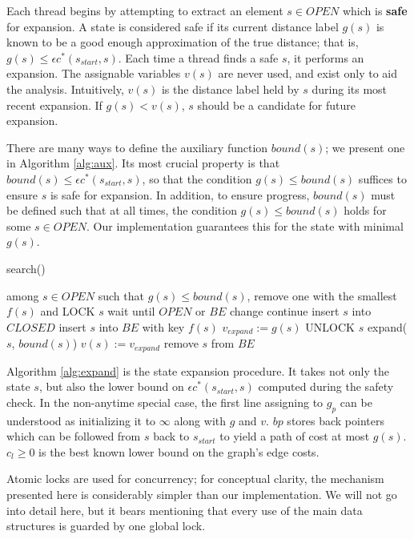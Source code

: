 \documentclass[letterpaper]{article}
\begin{document}
Each thread begins by attempting to extract an element $s\in OPEN$ which is \textbf{safe} for expansion. A state is considered safe if its current distance label $g(s)$ is known to be a good enough approximation of the true distance; that is, $g(s) \le \epsilon c^*(s_{start},s)$. Each time a thread finds a safe $s$, it performs an expansion. The assignable variables $v(s)$ are never used, and exist only to aid the analysis. Intuitively, $v(s)$ is the distance label held by $s$ during its most recent expansion. If $g(s) < v(s)$, $s$ should be a candidate for future expansion.

There are many ways to define the auxiliary function $bound(s)$; we present one in Algorithm \ref{alg:aux}. Its most crucial property is that $bound(s) \le \epsilon c^*(s_{start},s)$, so that the condition $g(s) \le bound(s)$ suffices to ensure $s$ is safe for expansion. In addition, to ensure progress, $bound(s)$ must be defined such that at all times, the condition $g(s) \le bound(s)$ holds for some $s\in OPEN$. Our implementation guarantees this for the state with minimal $g(s)$.

\begin{algorithm}
\caption{search()}
\label{alg:search}
\begin{algorithmic}
\STATE among $s\in OPEN$ such that $g(s) \le bound(s)$, remove one with the smallest $f(s)$ and LOCK $s$
\STATE wait until $OPEN$ or $BE$ change
\STATE continue
\ENDIF
\STATE insert $s$ into $CLOSED$
\STATE insert $s$ into $BE$ with key $f(s)$
\STATE $v_{expand} := g(s)$
\STATE UNLOCK $s$
\STATE expand($s$, $bound(s)$)
\STATE $v(s) := v_{expand}$
\STATE remove $s$ from $BE$
\ENDWHILE
\end{algorithmic}
\end{algorithm}

Algorithm \ref{alg:expand} is the state expansion procedure. It takes not only the state $s$, but also the lower bound on $\epsilon c^*(s_{start},s)$ computed during the safety check. In the non-anytime special case, the first line assigning to $g_p$ can be understood as initializing it to $\infty$ along with $g$ and $v$. $bp$ stores back pointers which can be followed from $s$ back to $s_{start}$ to yield a path of cost at most $g(s)$. $c_l \ge 0$ is the best known lower bound on the graph's edge costs.

Atomic locks are used for concurrency; for conceptual clarity, the mechanism presented here is considerably simpler than our implementation. We will not go into detail here, but it bears mentioning that every use of the main data structures is guarded by one global lock.
\end{document}
